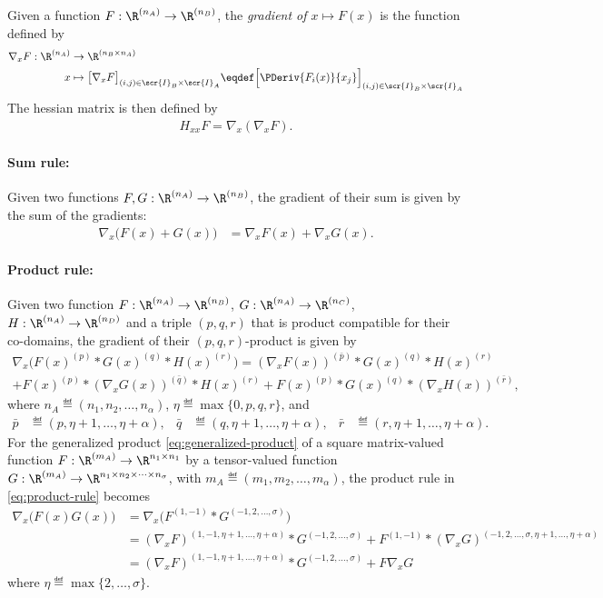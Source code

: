 \documentclass[11pt]{article}
\theoremstyle{remark}
\begin{document}
Given a function $F:\R^{(n_A)}\to\R^{(n_B)}$, the \emph{gradient of
  $x\mapsto F(x)$} is the function defined by
\begin{align*}
  \nabla_x F:\R^{(n_A)}&\to\R^{(n_B\times n_A)}\\
  x&\mapsto\big[\nabla_x F\big]_{(i,j)\in\scr{I}_B\times\scr{I}_A}
  \eqdef\Big[\PDeriv{F_i(x)}{x_j}\Big]_{(i,j)\in\scr{I}_B\times\scr{I}_A}
\end{align*}
The hessian matrix is then defined by
\begin{align*}
  H_{xx} F=\nabla_x (\nabla_x F).
\end{align*}

\paragraph{Sum rule:} Given two functions
$F,G:\R^{(n_A)}\to\R^{(n_B)}$, the gradient of their sum is
given by the sum of the gradients:
\begin{align*}
  \nabla_x \big( F(x)+G(x) \big)
  &=\nabla_x F(x)+ \nabla_xG(x).
\end{align*}
\paragraph{Product rule:} Given two function
$F:\R^{(n_A)}\to\R^{(n_B)}$, $G:\R^{(n_A)}\to\R^{(n_C)}$,
$H:\R^{(n_A)}\to\R^{(n_D)}$ and a triple $(p,q,r)$ that is product
compatible for their co-domains, the gradient of their
$(p,q,r)$-product is given by
\begin{multline}\label{eq:product-rule}
  \nabla_x \big( F(x)^{(p)} * G(x)^{(q)} * H(x)^{(r)} \big)
  =(\nabla_xF(x))^{(\bar p)} * G(x)^{(q)} * H(x)^{(r)}\\
  + F(x)^{(p)} * (\nabla_xG(x))^{(\bar q)} * H(x)^{(r)}
  + F(x)^{(p)} *  G(x)^{(q)} * (\nabla_x H(x))^{(\bar r)},
\end{multline}
where $n_A\eqdef(n_1,n_2,\dots,n_\alpha)$, $\eta\eqdef\max\{0,p,q,r\}$, and
\begin{align*}
  \bar p&\eqdef(p,\eta+1,\dots,\eta+\alpha), &
  \bar q&\eqdef(q,\eta+1,\dots,\eta+\alpha), &
  \bar r&\eqdef(r,\eta+1,\dots,\eta+\alpha).
\end{align*}
For the generalized product \eqref{eq:generalized-product} of a square
matrix-valued function $F:\R^{(m_A)}\to\R^{n_1\times n_1}$ by a tensor-valued
function
$G:\R^{(m_A)}\to\R^{n_1\times n_2\times \cdots\times n_\sigma}$, with
$m_A\eqdef(m_1,m_2,\dots,m_\alpha)$, the product rule in \eqref{eq:product-rule}
becomes
\begin{align*}
  \nabla_x \big(F(x)G(x)\big)
  &=\nabla_x \big( F^{(1,-1)} * G^{(-1,2,\dots,\sigma)} \big)\\
  &=(\nabla_xF)^{(1,-1,\eta+1,\dots,\eta+\alpha)} * G^{(-1,2,\dots,\sigma)}+
  F^{(1,-1)} * (\nabla_xG)^{(-1,2,\dots,\sigma,\eta+1,\dots,\eta+\alpha)}\\
  &=(\nabla_xF)^{(1,-1,\eta+1,\dots,\eta+\alpha)} * G^{(-1,2,\dots,\sigma)}+F \nabla_xG
\end{align*}
where $\eta\eqdef\max\{2,\dots,\sigma\}$.
\end{document}
